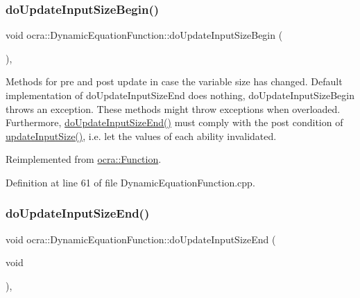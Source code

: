 \subsubsection{\texorpdfstring{do\+Update\+Input\+Size\+Begin()}{doUpdateInputSizeBegin()}}
{\footnotesize\ttfamily void ocra\+::\+Dynamic\+Equation\+Function\+::do\+Update\+Input\+Size\+Begin (\begin{DoxyParamCaption}{ }\end{DoxyParamCaption})\hspace{0.3cm}{\ttfamily [protected]}, {\ttfamily [virtual]}}

Methods for pre and post update in case the variable size has changed. Default implementation of do\+Update\+Input\+Size\+End does nothing, do\+Update\+Input\+Size\+Begin throws an exception. These methods might throw exceptions when overloaded. Furthermore, {\ttfamily \hyperlink{classocra_1_1DynamicEquationFunction_a8d20f6ed1e3983d1fddf648729eba955}{do\+Update\+Input\+Size\+End()}} must comply with the post condition of {\ttfamily \hyperlink{classocra_1_1Function_a3a5b9e6ae296339acc87ab2cbf97ef98}{update\+Input\+Size()}}, i.\+e. let the values of each ability invalidated. 

Reimplemented from \hyperlink{classocra_1_1Function_a3f728f3758e6448aa59932853db5ddcc}{ocra\+::\+Function}.



Definition at line 61 of file Dynamic\+Equation\+Function.\+cpp.

\hypertarget{classocra_1_1DynamicEquationFunction_a8d20f6ed1e3983d1fddf648729eba955}{}\label{classocra_1_1DynamicEquationFunction_a8d20f6ed1e3983d1fddf648729eba955} 
\subsubsection{\texorpdfstring{do\+Update\+Input\+Size\+End()}{doUpdateInputSizeEnd()}}
{\footnotesize\ttfamily void ocra\+::\+Dynamic\+Equation\+Function\+::do\+Update\+Input\+Size\+End (\begin{DoxyParamCaption}\item[{void}]{ }\end{DoxyParamCaption})\hspace{0.3cm}{\ttfamily [protected]}, {\ttfamily [virtual]}}

